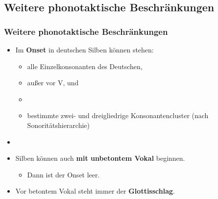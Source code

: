 \subsection{Weitere phonotaktische Beschränkungen}

\begin{frame}
\frametitle{Weitere phonotaktische Beschränkungen}

\begin{itemize}
	\item Im \textbf{Onset} in deutschen Silben können stehen:

	\begin{itemize}
		\item alle Einzelkonsonanten des Deutschen,
		\item außer \textipa{[s]} vor V, und \textipa{[N]}
		\item[]
		\item bestimmte zwei- und dreigliedrige Konsonantencluster (nach Sonoritätshierarchie)
	\end{itemize}
	
	\item[]

	\item Silben können auch \textbf{mit unbetontem Vokal} beginnen.

	\begin{itemize}
		\item Dann ist der Onset leer.
		  \ea
                  \z

		  \ea
                  \z
	
	\end{itemize}
	
	\item Vor betontem Vokal steht immer der \textbf{Glottisschlag}.

	  \ea
          \z

\end{itemize}

\end{frame}



